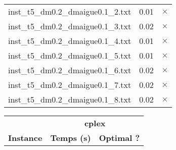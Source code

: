 \documentclass{article}
\begin{document}
\begin{center}
\begin{tabular}{lrr}
inst\_t5\_dm0.2\_dmaigue0.1\_2.txt & 0.01 & 
$\times$
\\
inst\_t5\_dm0.2\_dmaigue0.1\_3.txt & 0.02 & 
$\times$
\\
inst\_t5\_dm0.2\_dmaigue0.1\_4.txt & 0.01 & 
$\times$
\\
inst\_t5\_dm0.2\_dmaigue0.1\_5.txt & 0.01 & 
$\times$
\\
inst\_t5\_dm0.2\_dmaigue0.1\_6.txt & 0.02 & 
$\times$
\\
inst\_t5\_dm0.2\_dmaigue0.1\_7.txt & 0.02 & 
$\times$
\\
inst\_t5\_dm0.2\_dmaigue0.1\_8.txt & 0.02 & 
$\times$
\\
\hline\end{tabular}
\end{center}

\newpage
\begin{center}
\renewcommand{\arraystretch}{1.4} 
 \begin{tabular}{lrr}
	\hline
 & \multicolumn{2}{c}{\textbf{cplex}}\\
\textbf{Instance}  & \textbf{Temps (s)} & \textbf{Optimal ?} \\\hline


\end{tabular}
\end{center}
\end{document}
